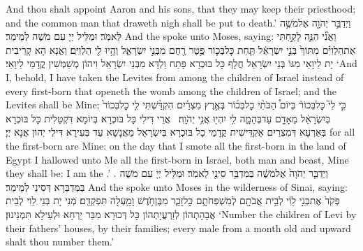 {And thou shalt appoint Aaron and his sons, that they may keep their priesthood; and the common man that draweth nigh shall be put to death.’}{}
{וַיְדַבֵּ֥ר יְהֹוָ֖ה אֶל\maqqaf מֹשֶׁ֥ה לֵּאמֹֽר׃}
{וּמַלֵּיל יְיָ עִם מֹשֶׁה לְמֵימַר׃}
{And the \lord\space spoke unto Moses, saying:}{}
{וַאֲנִ֞י הִנֵּ֧ה לָקַ֣חְתִּי אֶת\maqqaf הַלְוִיִּ֗ם מִתּוֹךְ֙ בְּנֵ֣י יִשְׂרָאֵ֔ל תַּ֧חַת כׇּל\maqqaf בְּכ֛וֹר פֶּ֥טֶר רֶ֖חֶם מִבְּנֵ֣י יִשְׂרָאֵ֑ל וְהָ֥יוּ לִ֖י הַלְוִיִּֽם׃}
{וַאֲנָא הָא קָרֵיבִית יָת לֵיוָאֵי מִגּוֹ בְּנֵי יִשְׂרָאֵל חֲלָף כָּל בּוּכְרָא פָּתַח וַלְדָּא מִבְּנֵי יִשְׂרָאֵל וִיהוֹן מְשַׁמְּשִׁין קֳדָמַי לֵיוָאֵי׃}
{‘And I, behold, I have taken the Levites from among the children of Israel instead of every first-born that openeth the womb among the children of Israel; and the Levites shall be Mine;}{}
{כִּ֣י לִי֮ כׇּל\maqqaf בְּכוֹר֒ בְּיוֹם֩ הַכֹּתִ֨י כׇל\maqqaf בְּכ֜וֹר בְּאֶ֣רֶץ מִצְרַ֗יִם הִקְדַּ֨שְׁתִּי לִ֤י כׇל\maqqaf בְּכוֹר֙ בְּיִשְׂרָאֵ֔ל מֵאָדָ֖ם עַד\maqqaf בְּהֵמָ֑ה לִ֥י יִהְי֖וּ אֲנִ֥י יְהֹוָֽה׃ \petucha }
{אֲרֵי דִּילִי כָּל בּוּכְרָא בְּיוֹמָא דִּקְטַלִית כָּל בּוּכְרָא בְּאַרְעָא דְּמִצְרַיִם אַקְדֵּישִׁית קֳדָמַי כָל בּוּכְרָא בְּיִשְׂרָאֵל מֵאֲנָשָׁא עַד בְּעִירָא דִּילִי יְהוֹן אֲנָא יְיָ׃}
{for all the first-born are Mine: on the day that I smote all the first-born in the land of Egypt I hallowed unto Me all the first-born in Israel, both man and beast, Mine they shall be: I am the \lord.’ .}{}
{וַיְדַבֵּ֤ר יְהֹוָה֙ אֶל\maqqaf מֹשֶׁ֔ה בְּמִדְבַּ֥ר סִינַ֖י לֵאמֹֽר׃}
{וּמַלֵּיל יְיָ עִם מֹשֶׁה בְּמַדְבְּרָא דְּסִינַי לְמֵימַר׃}
{And the \lord\space spoke unto Moses in the wilderness of Sinai, saying:}{}
{פְּקֹד֙ אֶת\maqqaf בְּנֵ֣י לֵוִ֔י לְבֵ֥ית אֲבֹתָ֖ם לְמִשְׁפְּחֹתָ֑ם כׇּל\maqqaf זָכָ֛ר מִבֶּן\maqqaf חֹ֥דֶשׁ וָמַ֖עְלָה תִּפְקְדֵֽם׃}
{מְנִי יָת בְּנֵי לֵוִי לְבֵית אֲבָהָתְהוֹן לְזַרְעֲיָתְהוֹן כָּל דְּכוּרָא מִבַּר יַרְחָא וּלְעֵילָא תִּמְנֵינוּן׃}
{‘Number the children of Levi by their fathers’ houses, by their families; every male from a month old and upward shalt thou number them.’}{}

